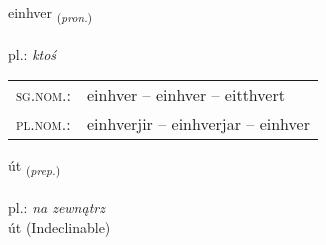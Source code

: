 \documentclass[frontgrid, backgrid]{flacards}\usepackage[]{graphicx}\usepackage[]{xcolor}
\begin{document}
\renewcommand{\flhead}{\vskip5pt \fboxsep=0pt {\small\bfseries\footnotesize Fornafn | zaimek}}
\renewcommand{\fcfoot}{\vskip5pt \fboxsep=0pt \hspace{2pt}{\small\bfseries\footnotesize 1K}}

\renewcommand{\blhead}{\vskip5pt {\small\bfseries\footnotesize Fornafn | zaimek }}
\renewcommand{\bcfoot}{\vskip5pt \hspace{2pt}{\small\bfseries\footnotesize 1K}}


{einhver \small{\textsubscript{(\textit{pron.})}} \\[1ex] %
 \\
pl.: \emph{ktoś} \\  [2ex]
\renewcommand*{\arraystretch}{0.8}
\begin{tabular}{ll}
\textsc{sg.nom.}: & einhver  --  einhver -- eitthvert \\ 
\textsc{pl.nom.}: & einhverjir -- einhverjar -- einhver
\end{tabular}
}


\renewcommand{\flhead}{\vskip5pt \fboxsep=0pt {\small\bfseries\footnotesize Forsetning | przyimek}}
\renewcommand{\fcfoot}{\vskip5pt \fboxsep=0pt \hspace{2pt}{\small\bfseries\footnotesize 1K}}

\renewcommand{\blhead}{\vskip5pt {\small\bfseries\footnotesize Forsetning | przyimek }}
\renewcommand{\bcfoot}{\vskip5pt \hspace{2pt}{\small\bfseries\footnotesize 1K}}


{út \small{\textsubscript{(\textit{prep.})}} \\[1ex]
\textphonetic{[uːt]} \\
pl.: \emph{na zewnątrz} \\  [2ex]
út (Indeclinable)}

\renewcommand{\flhead}{\vskip5pt \fboxsep=0pt {\small\bfseries\footnotesize Sagnorð | czasownik}}
\renewcommand{\fcfoot}{\vskip5pt \fboxsep=0pt \hspace{2pt}{\small\bfseries\footnotesize 1K}}
\end{document}
